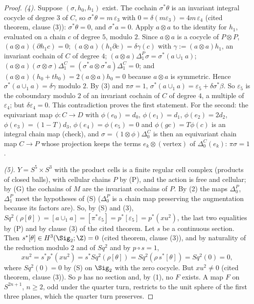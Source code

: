 \begin{proof}
\emph{(4).} Suppose $(\sigma, h_{0}, h_{1})$ exist. The cochain $\sigma^{*}\theta$ is an invariant integral cocycle of degree $3$ of $C$, so $\sigma^{*}\theta = m\,\varepsilon_{3}$ with $0 = \delta(m\varepsilon_{3}) = 4m\,\varepsilon_{4}$ (cited theorem, clause (3)): $\sigma^{*}\theta = 0$, and $\sigma^{*}a = 0$. Apply $a \otimes a$ to the identity for $h_{1}$, evaluated on a chain $c$ of degree $5$, modulo $2$. Since $a \otimes a$ is a cocycle of $P \otimes P$, $(a \otimes a)(\partial h_{1}c) = 0$; $(a \otimes a)(h_{1}\partial c) = \delta\gamma(c)$ with $\gamma := (a \otimes a)h_{1}$, an invariant cochain of $C$ of degree $4$; $(a \otimes a)\Delta_{1}^{P}\sigma = \sigma^{*}(a \cup_{1} a)$; $(a \otimes a)(\sigma \otimes \sigma)\Delta_{1}^{C} = (\sigma^{*}a \otimes \sigma^{*}a)\Delta_{1}^{C} = 0$; and $(a \otimes a)(h_{0} + th_{0}) = 2(a \otimes a)h_{0} = 0$ because $a \otimes a$ is symmetric. Hence $\sigma^{*}(a \cup_{1} a) = \delta\gamma$ modulo $2$. By (3) and $\pi\sigma = 1$, $\sigma^{*}(a \cup_{1} a) = \varepsilon_{5} + \delta\sigma^{*}\beta$. So $\varepsilon_{5}$ is the coboundary modulo $2$ of an invariant cochain of $C$ of degree $4$, a multiple of $\varepsilon_{4}$; but $\delta\varepsilon_{4} = 0$. This contradiction proves the first statement. For the second: the equivariant map $\phi : C \to D$ with $\phi(e_{0}) = d_{0}$, $\phi(e_{1}) = d_{1}$, $\phi(e_{2}) = 2d_{2}$, $\phi(e_{3}) = (1 - T)d_{3}$, $\phi(e_{4}) = \phi(e_{5}) = 0$ and $\phi(gc) = T\phi(c)$ is an integral chain map (check), and $\sigma = (1 \otimes \phi)\Delta_{0}^{C}$ is then an equivariant chain map $C \to P$ whose projection keeps the terms $e_{k} \otimes (\text{vertex})$ of $\Delta_{0}^{C}(e_{k})$: $\pi\sigma = 1$.

\emph{(5).} $Y = S^{5} \times S^{3}$ with the product cells is a finite regular cell complex (products of closed balls), with cellular chains $P$ by (P), and the action is free and cellular; by (G) the cochains of $M$ are the invariant cochains of $P$. By (2) the maps $\Delta_{0}^{P}$, $\Delta_{1}^{P}$ meet the hypotheses of (S) ($\Delta_{0}^{P}$ is a chain map preserving the augmentation because its factors are). So, by (S) and (3), $Sq^{2}(\rho[\theta]) = [a \cup_{1} a] = [\pi^{*}\varepsilon_{5}] = p^{*}[\varepsilon_{5}] = p^{*}(xu^{2})$, the last two equalities by (P) and by clause (3) of the cited theorem. Let $s$ be a continuous section. Then $s^{*}[\theta] \in H^{3}(\Sig_{2}; \Z) = 0$ (cited theorem, clause (3)), and by naturality of the reduction modulo $2$ and of $Sq^{2}$ and by $p \circ s = 1$,
\[
xu^{2} = s^{*}p^{*}(xu^{2}) = s^{*}Sq^{2}(\rho[\theta]) = Sq^{2}(\rho\,s^{*}[\theta]) = Sq^{2}(0) = 0,
\]
where $Sq^{2}(0) = 0$ by (S) on $\Sig_{2}$ with the zero cocycle. But $xu^{2} \neq 0$ (cited theorem, clause (3)). So $p$ has no section and, by (1), no $F$ exists. A map $F$ on $S^{2n+1}$, $n \geq 2$, odd under the quarter turn, restricts to the unit sphere of the first three planes, which the quarter turn preserves.


\end{proof}
